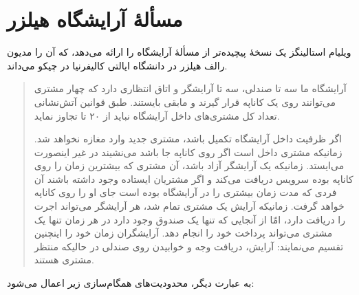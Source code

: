 \documentclass{book}
\begin{document}
\section {مسألهٔ آرایشگاه هیلزر}

	ویلیام استالینگز \cite{stallings}  
	یک نسخهٔ پیچیده‌تر از مسألهٔ آرایشگاه را ارائه می‌دهد، 
	که آن را مدیون رالف هیلزر در دانشگاه ایالتی کالیفرنیا در چیکو می‌داند.

\begin{quotation}
    آرایشگاه ما سه تا صندلی،‌ سه تا آرایشگر و اتاق انتظاری دارد که  چهار مشتری می‌توانند روی یک کاناپه قرار گیرند و مابقی بایستند. 
    طبق قوانین آتش‌نشانی تعداد کل مشتری‌های داخل آرایشگاه نباید از ۲۰ تا تجاوز نماید. 
    
    اگر ظرفیت داخل آرایشگاه تکمیل باشد، مشتری جدید وارد مغازه نخواهد شد. 
    زمانیکه مشتری داخل است اگر روی کاناپه جا باشد می‌نشیند در غیر اینصورت می‌ایستد. 
    زمانیکه یک آرایشگر آزاد باشد، آن مشتری که بیشترین زمان را روی کاناپه بوده  سرویس دریافت می‌کند و اگر مشتریان ایستاده وجود داشته باشند 
    آن فردی که مدت زمان بیشتری را در آرایشگاه بوده است جای او را روی کاناپه خواهد گرفت. 
    زمانیکه آرایش یک مشتری تمام شد،‌ هر آرایشگر می‌تواند اجرت را دریافت دارد،‌ امّا از آنجایی که تنها یک صندوق وجود دارد
    در هر زمان تنها یک مشتری می‌تواند پرداخت خود را انجام دهد. 
    آرایشگران زمان خود را اینچنین تقسیم می‌نمایند: آرایش، دریافت وجه و خوابیدن روی صندلی در حالیکه منتظر مشتری هستند.
\end{quotation}

    به عبارت دیگر، محدودیت‌های همگام‌سازی زیر اعمال می‌شود:
\end{document}
